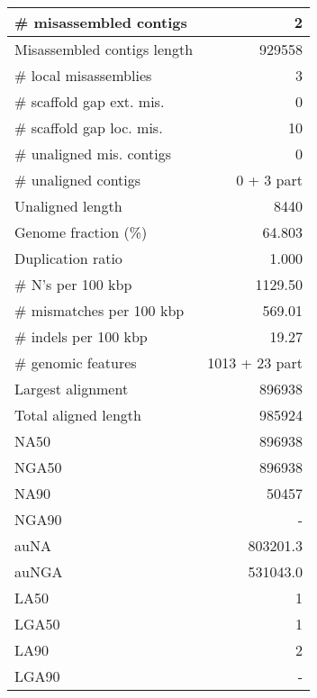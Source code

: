 \documentclass[12pt,a4paper]{article}
\begin{document}
\begin{table}[ht]
\begin{center}
\begin{tabular}{|l*{1}{|r}|}
\# misassembled contigs & 2 \\ \hline
Misassembled contigs length & 929558 \\ \hline
\# local misassemblies & 3 \\ \hline
\# scaffold gap ext. mis. & 0 \\ \hline
\# scaffold gap loc. mis. & 10 \\ \hline
\# unaligned mis. contigs & 0 \\ \hline
\# unaligned contigs & 0 + 3 part \\ \hline
Unaligned length & 8440 \\ \hline
Genome fraction (\%) & 64.803 \\ \hline
Duplication ratio & 1.000 \\ \hline
\# N's per 100 kbp & 1129.50 \\ \hline
\# mismatches per 100 kbp & 569.01 \\ \hline
\# indels per 100 kbp & 19.27 \\ \hline
\# genomic features & 1013 + 23 part \\ \hline
Largest alignment & 896938 \\ \hline
Total aligned length & 985924 \\ \hline
NA50 & 896938 \\ \hline
NGA50 & 896938 \\ \hline
NA90 & 50457 \\ \hline
NGA90 & - \\ \hline
auNA & 803201.3 \\ \hline
auNGA & 531043.0 \\ \hline
LA50 & 1 \\ \hline
LGA50 & 1 \\ \hline
LA90 & 2 \\ \hline
LGA90 & - \\ \hline
\end{tabular}
\end{center}
\end{table}
\end{document}
